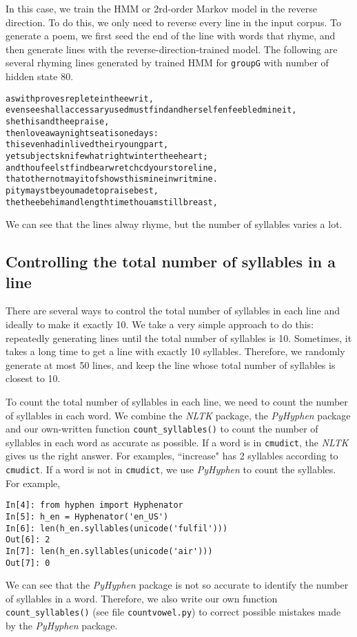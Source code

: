 In this case, we train the HMM or 2rd-order Markov model in the reverse direction. To do this, we only need to reverse every line in the input corpus. To generate a poem, we first seed the end of the line with words that rhyme, and then generate lines with the reverse-direction-trained model. The following are several rhyming lines generated by trained HMM for \texttt{groupG} with number of hidden state 80.
\begin{alltt}
 as with proves replete in thee writ, 
 even see shall accessary used must find and herself enfeebled mine it,
 she this and thee praise,
 then love away night seat is one days: 
 this even had in lived their young part,
 yet subjects knife what right winter thee heart;
 and thou feelst find bear wretchcd your store line,
 that other not may it of shows this mine in writ mine.
 pity mayst be you made to praise best,
 the thee be him and length time thou am still breast, 
\end{alltt}
We can see that the lines alway rhyme, but the number of syllables varies a lot.

\subsection{Controlling the total number of syllables in a line}
There are several ways to control the total number of syllables in each line and ideally to make it exactly 10. We take a very simple approach to do this: repeatedly generating lines until the total number of syllables is 10. Sometimes, it takes a long time to get a line with exactly 10 syllables. Therefore, we randomly generate at most 50 lines, and keep the line whose total number of syllables is closest to 10.

To count the total number of syllables in each line, we need to count the number of syllables in each word. We combine the \textit{NLTK} package, the \textit{PyHyphen} package and our own-written function \texttt{count\_syllables()} to count the number of syllables in each word as accurate as possible. If a word is in \texttt{cmudict}, the \textit{NLTK} gives us the right answer. For examples, ``increase" has 2 syllables according to \texttt{cmudict}. If a word is not in \texttt{cmudict}, we use \textit{PyHyphen} to count the syllables. For example,
\begin{lstlisting}
In[4]: from hyphen import Hyphenator
In[5]: h_en = Hyphenator('en_US')
In[6]: len(h_en.syllables(unicode('fulfil')))
Out[6]: 2
In[7]: len(h_en.syllables(unicode('air')))
Out[7]: 0
\end{lstlisting}
We can see that the \textit{PyHyphen} package is not so accurate to identify the number of syllables in a word. Therefore, we also write our own function \texttt{count\_syllables()} (see file \texttt{countvowel.py}) to correct possible mistakes made by the \textit{PyHyphen} package.

